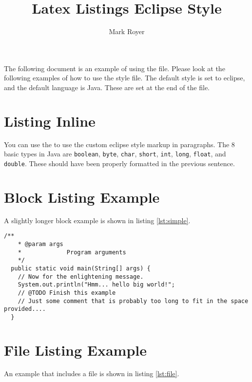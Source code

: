 \documentclass{article}
\title{Latex Listings Eclipse Style}
\date{}
\author{Mark Royer}
\begin{document}
\abstract

The following document is an example of using the
 file.  Please look at the following examples
of how to use the style file. The default style is set to eclipse, and
the default language is Java.  These are set at the end of the
 file.

\section*{Listing Inline}

\lstset{breaklines=false}

You can use the  to use the custom
eclipse style markup in paragraphs.  The 8 basic types in Java are
\lstinline$boolean$, \lstinline$byte$, \lstinline$char$,
\lstinline$short$, \lstinline$int$, \lstinline$long$,
\lstinline$float$, and \lstinline$double$. These should have been
properly formatted in the previous sentence.

\lstset{breaklines=true}

\section*{Block Listing Example}

A slightly longer block example is shown in listing \ref{lst:simple}.

\begin{lstlisting}[caption={A simple listing.}, label={lst:simple}]
  /**
    * @param args
    *             Program arguments
    */
  public static void main(String[] args) {
    // Now for the enlightening message.
    System.out.println("Hmm... hello big world!";
    // @TODO Finish this example
    // Just some comment that is probably too long to fit in the space provided....
  }
\end{lstlisting}

\section*{File Listing Example}

An example that includes a  file is shown in listing \ref{lst:file}.


\end{document}
